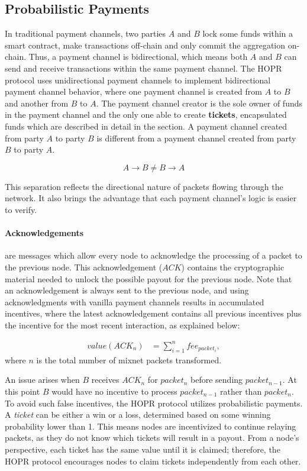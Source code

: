 \subsection{Probabilistic Payments}
\label{sec:probabilisticpayments}

In traditional payment channels, two parties $A$ and $B$ lock some funds within a
smart contract, make transactions off-chain and only commit the aggregation
on-chain. Thus, a payment channel is bidirectional, which means both $A$ and $B$ can
send and receive transactions within the same payment channel. The HOPR protocol uses
unidirectional payment channels to implement bidirectional payment channel behavior, where one
payment channel is created from $A$ to $B$ and another from $B$ to $A$. The payment channel creator is
the sole owner of funds in the payment channel and the only one able to create
\textbf{tickets}, encapsulated funds which are described in detail in the
 section. A payment channel created from party $A$ to party $B$ is
different from a payment channel created from party $B$ to party $A$.

$$A\rightarrow B \neq B\rightarrow A$$

This separation reflects the directional nature of packets flowing through the
network. It also brings the advantage that each payment channel's logic is easier to verify.

\paragraph{Acknowledgements} are messages which allow every node to acknowledge
the processing of a packet to the previous node. This acknowledgement ($ACK$) contains
the cryptographic material needed to unlock the possible payout for the previous node.
Note that an acknowledgement is always sent to the previous node, and using
acknowledgments with vanilla payment channels results in accumulated incentives,
where the latest acknowledgement contains all previous incentives plus the
incentive for the most recent interaction, as explained below:

\begin{align}
value (ACK_n) &=\sum_{i=1}^nfee_{packet_i},
\end{align}
where $n$ is the total number of mixnet packets transformed.

An issue arises when $B$ receives $ACK_n$ for $packet_n$ before sending
$packet_{n-1}$. At this point $B$ would have no incentive to process
$packet_{n-1}$ rather than $packet_{n}$. To avoid such false incentives, the HOPR
protocol utilizes probabilistic payments. A \textit{ticket} can be either a win
or a loss, determined based on some winning probability lower than 1. This means
nodes are incentivized to continue relaying packets, as they do not know which
tickets will result in a payout. From a node's perspective, each ticket has the same
value until it is claimed; therefore, the HOPR protocol encourages nodes to
claim tickets independently from each other.

